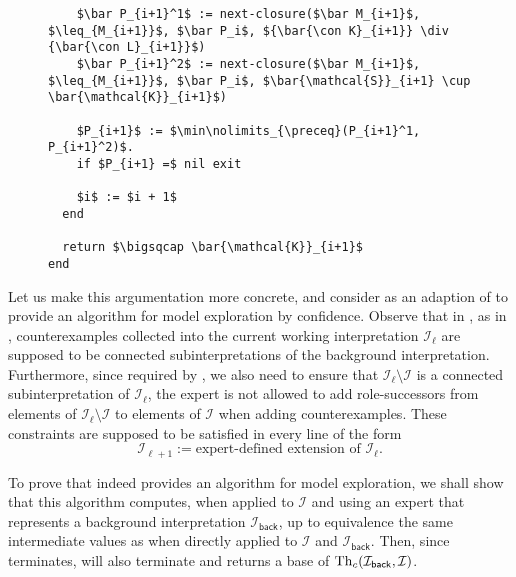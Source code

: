 \begin{figure}[tp]
\begin{Algorithm}
\begin{lstlisting}
    $\bar P_{i+1}^1$ := next-closure($\bar M_{i+1}$, $\leq_{M_{i+1}}$, $\bar P_i$, ${\bar{\con K}_{i+1}} \div {\bar{\con L}_{i+1}}$)
    $\bar P_{i+1}^2$ := next-closure($\bar M_{i+1}$, $\leq_{M_{i+1}}$, $\bar P_i$, $\bar{\mathcal{S}}_{i+1} \cup \bar{\mathcal{K}}_{i+1}$)

    $P_{i+1}$ := $\min\nolimits_{\preceq}(P_{i+1}^1, P_{i+1}^2)$.
    if $P_{i+1} =$ nil exit

    $i$ := $i + 1$
  end

  return $\bigsqcap \bar{\mathcal{K}}_{i+1}$
end
    \end{lstlisting}
  \end{Algorithm}
\end{figure}

Let us make this argumentation more concrete, and consider
 as an adaption of
 to provide an algorithm for model
exploration by confidence.  Observe that in , as
in , counterexamples collected into the current working
interpretation $\mathcal{I}_{\ell}$ are supposed to be connected subinterpretations of the
background interpretation.  Furthermore, since required by
, we also need to ensure that
$\mathcal{I}_{\ell} \setminus \mathcal{I}$ is a connected subinterpretation of
$\mathcal{I}_{\ell}$, \ie the expert is not allowed to add role-successors from elements
of $\mathcal{I}_{\ell} \setminus \mathcal{I}$ to elements of $\mathcal{I}$ when adding
counterexamples.  These constraints are supposed to be satisfied in every line of the form
\begin{equation*}
  \mathcal{I}_{\ell+1} := \text{expert-defined extension of } \mathcal{I}_\ell.
\end{equation*}

To prove that  indeed provides an algorithm for
model exploration, we shall show that this algorithm computes, when applied to
$\mathcal{I}$ and using an expert that represents a background interpretation
$\mathcal{I}_{\mathsf{back}}$, up to equivalence the same intermediate values as
 when directly applied to $\mathcal{I}$ and
$\mathcal{I}_{\mathsf{back}}$.  Then, since 
terminates,  will also terminate and returns a
base of $\operatorname{Th}_{c}(\mathcal{I}_{\mathsf{back}}, \mathcal{I})$.

